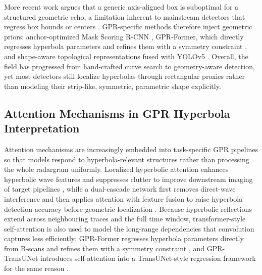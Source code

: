 \documentclass[lettersize,journal]{IEEEtran}
\begin{document}
More recent work argues that a generic axis-aligned box is suboptimal for a structured geometric echo, a limitation inherent to mainstream detectors that regress box bounds or centers \cite{ren2015fasterrcnn,zhou2019centernet}. GPR-specific methods therefore inject geometric priors: anchor-optimized Mask Scoring R-CNN \cite{hou2021msrcnn}, GPR-Former, which directly regresses hyperbola parameters and refines them with a symmetry constraint \cite{jin2024gprformer}, and shape-aware topological representations fused with YOLOv5 \cite{kang2025tda}. Overall, the field has progressed from hand-crafted curve search to geometry-aware detection, yet most detectors still localize hyperbolas through rectangular proxies rather than modeling their strip-like, symmetric, parametric shape explicitly.

\subsection{Attention Mechanisms in GPR Hyperbola Interpretation}
Attention mechanisms are increasingly embedded into task-specific GPR pipelines so that models respond to hyperbola-relevant structures rather than processing the whole radargram uniformly. Localized hyperbolic attention enhances hyperbolic wave features and suppresses clutter to improve downstream imaging of target pipelines \cite{liu2025hyperbolic}, while a dual-cascade network first removes direct-wave interference and then applies attention with feature fusion to raise hyperbola detection accuracy before geometric localization \cite{wang2025underground}. Because hyperbolic reflections extend across neighbouring traces and the full time window, transformer-style self-attention is also used to model the long-range dependencies that convolution captures less efficiently: GPR-Former regresses hyperbola parameters directly from B-scans and refines them with a symmetry constraint \cite{jin2024gprformer}, and GPR-TransUNet introduces self-attention into a TransUNet-style regression framework for the same reason \cite{ge2024gprtransunet}.
\end{document}
